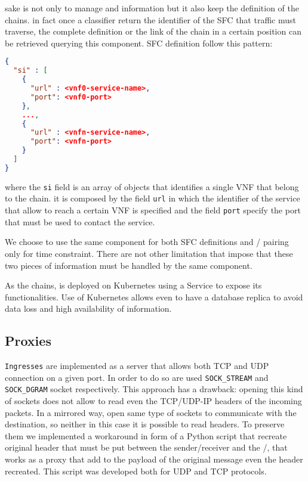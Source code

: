 \roulette{} sake is not only to manage \ingresses{} and \egresses{} information
but it also keep the definition of the chains. in fact once a classifier return
the identifier of the SFC that traffic must traverse, the complete definition
or the link of the chain in a certain position can be retrieved querying this
component. SFC definition follow this pattern:

\begin{lstlisting}[caption={Definition of an SFC}, captionpos=b, language=json]
{
  "si" : [
    {
      "url" : <vnf0-service-name>,
      "port": <vnf0-port>
    },
    ...,
    {
      "url" : <vnfn-service-name>,
      "port": <vnfn-port>
    }
  ]
}
\end{lstlisting}

where the \texttt{si} field is an array of objects that identifies a single VNF
that belong to the chain. it is composed by the field \texttt{url} in which the
identifier of the service that allow to reach a certain VNF is specified and the
field \texttt{port} specify the port that must be used to contact the service.

We choose to use the same component for both SFC definitions and 
\ingress{}/\egresses{} pairing only for time constraint. There are not other
limitation that impose that these two pieces of information must be handled by
the same component. 

As the chains, \roulette{} is deployed on Kubernetes using a Service to expose
its functionalities. Use of Kubernetes allows even to have a database replica to
avoid data loss and high availability of information.

\subsection{Proxies}
\texttt{Ingresses} are implemented as a server that allows both TCP and UDP
connection on a given port. In order to do so are used \verb!SOCK_STREAM! and
\verb!SOCK_DGRAM! socket respectively. This approach has a drawback: opening
this kind of sockets does not allow to read even the TCP/UDP-IP headers of the
incoming packets. In a mirrored way, \egresses{} open same type of sockets to
communicate with the destination, so neither in this case it is possible to read
headers. To preserve them we implemented a workaround in form of a Python script
that recreate original header that must be put between the sender/receiver and
the \ingress{}/\egresses{}, that works as a proxy that add to the payload of the
original message even the header recreated. This script was developed both for
UDP and TCP protocols.

